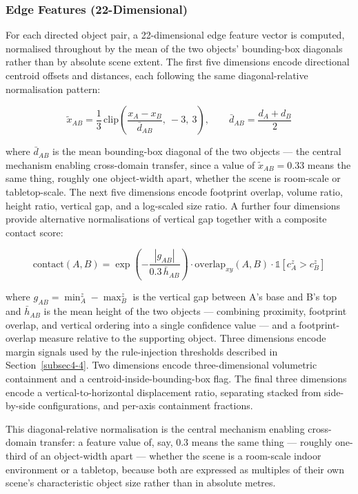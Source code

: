 \documentclass[sn-mathphys,Numbered]{sn-jnl}
\begin{document}
\subsubsection{Edge Features (22-Dimensional)}\label{subsubsec4-3-2}

For each directed object pair, a 22-dimensional edge feature vector is computed, normalised throughout by the mean of the two objects' bounding-box diagonals rather than by absolute scene extent. The first five dimensions encode directional centroid offsets and distances, each following the same diagonal-relative normalisation pattern:

\begin{equation}
\tilde{x}_{AB} = \frac{1}{3}\,\mathrm{clip}\!\left(\frac{x_A - x_B}{\bar d_{AB}},\ -3,\ 3\right), \qquad \bar d_{AB} = \frac{d_A + d_B}{2}
\label{eq:edgenorm}
\end{equation}

where $\bar d_{AB}$ is the mean bounding-box diagonal of the two objects --- the central mechanism enabling cross-domain transfer, since a value of $\tilde x_{AB}=0.33$ means the same thing, roughly one object-width apart, whether the scene is room-scale or tabletop-scale. The next five dimensions encode footprint overlap, volume ratio, height ratio, vertical gap, and a log-scaled size ratio. A further four dimensions provide alternative normalisations of vertical gap together with a composite contact score:

\begin{equation}
\mathrm{contact}(A,B) = \exp\!\left(-\frac{|g_{AB}|}{0.3\,\bar h_{AB}}\right) \cdot \mathrm{overlap}_{xy}(A,B) \cdot \mathbb{1}\!\left[c_A^z > c_B^z\right]
\label{eq:contact}
\end{equation}

where $g_{AB} = \min_A^z - \max_B^z$ is the vertical gap between A's base and B's top and $\bar h_{AB}$ is the mean height of the two objects --- combining proximity, footprint overlap, and vertical ordering into a single confidence value --- and a footprint-overlap measure relative to the supporting object. Three dimensions encode margin signals used by the rule-injection thresholds described in Section~\ref{subsec4-4}. Two dimensions encode three-dimensional volumetric containment and a centroid-inside-bounding-box flag. The final three dimensions encode a vertical-to-horizontal displacement ratio, separating stacked from side-by-side configurations, and per-axis containment fractions.

This diagonal-relative normalisation is the central mechanism enabling cross-domain transfer: a feature value of, say, 0.3 means the same thing --- roughly one-third of an object-width apart --- whether the scene is a room-scale indoor environment or a tabletop, because both are expressed as multiples of their own scene's characteristic object size rather than in absolute metres.
\end{document}
